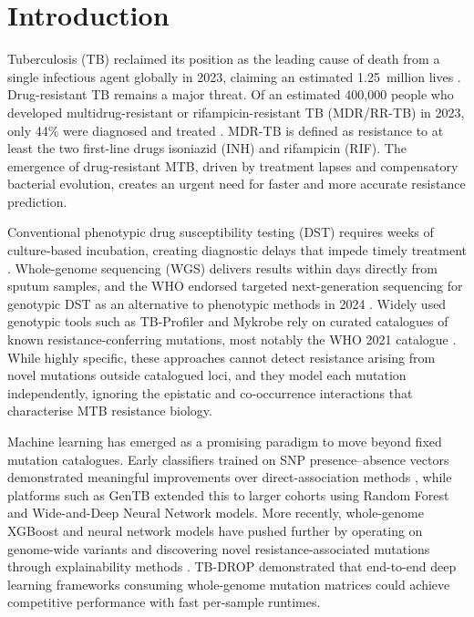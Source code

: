\documentclass{article}
\theoremstyle{plain}
\theoremstyle{definition}
\theoremstyle{remark}
\begin{document}

\section{Introduction}
\label{sec:intro}

Tuberculosis (TB) reclaimed its position as the leading cause of death from a single infectious agent globally in 2023, claiming an estimated 1.25~million lives \citep{who2024tb}. Drug-resistant TB remains a major threat. Of an estimated 400{,}000 people who developed multidrug-resistant or rifampicin-resistant TB (MDR/RR-TB) in 2023, only 44\% were diagnosed and treated \citep{who2024tb}. MDR-TB is defined as resistance to at least the two first-line drugs isoniazid (INH) and rifampicin (RIF). The emergence of drug-resistant MTB, driven by treatment lapses and compensatory bacterial evolution, creates an urgent need for faster and more accurate resistance prediction.

Conventional phenotypic drug susceptibility testing (DST) requires weeks of culture-based incubation, creating diagnostic delays that impede timely treatment \citep{who2024tb}. Whole-genome sequencing (WGS) delivers results within days directly from sputum samples, and the WHO endorsed targeted next-generation sequencing for genotypic DST as an alternative to phenotypic methods in 2024 \citep{who2024ngs}. Widely used genotypic tools such as TB-Profiler \citep{phelan2019tbprofiler} and Mykrobe \citep{hunt2019mykrobe} rely on curated catalogues of known resistance-conferring mutations, most notably the WHO 2021 catalogue \citep{walker2022who}. While highly specific, these approaches cannot detect resistance arising from novel mutations outside catalogued loci, and they model each mutation independently, ignoring the epistatic and co-occurrence interactions that characterise MTB resistance biology.

Machine learning has emerged as a promising paradigm to move beyond fixed mutation catalogues. Early classifiers trained on SNP presence--absence vectors demonstrated meaningful improvements over direct-association methods \citep{yang2018ml}, while platforms such as GenTB \citep{groschel2021gentb} extended this to larger cohorts using Random Forest and Wide-and-Deep Neural Network models. More recently, whole-genome XGBoost and neural network models have pushed further by operating on genome-wide variants and discovering novel resistance-associated mutations through explainability methods \citep{pal2025mlmtb}. TB-DROP \citep{wang2024tbdrop} demonstrated that end-to-end deep learning frameworks consuming whole-genome mutation matrices could achieve competitive performance with fast per-sample runtimes.
\end{document}
